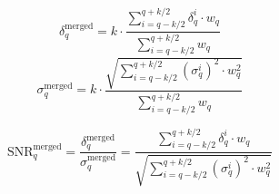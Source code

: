 
\begin{equation}
    \label{eq:merged_power}
    \delta_{q}^\text{merged} = k \cdot \frac{ \sum_{i = q-k/2}^{q+k/2}\delta_{q}^{i} \cdot {w_{q}}}{\sum_{i = q-k/2}^{q+k/2} {w_{q}}}
\end{equation}
\begin{equation}
    \label{eq:merged_sigma}
    \sigma_{q}^\text{merged} = k \cdot \frac{ \sqrt{\sum_{i = q-k/2}^{q+k/2} (\sigma_{q}^{i})^2 \cdot {w_{q}^2}}}{\sum_{i = q-k/2}^{q+k/2} {w_{q}}}
\end{equation}

\begin{equation}
    \label{eq:merged_snr}
    \text{SNR}_{q}^\text{merged} = \frac{\delta^\text{merged}_{q}}{\sigma^\text{merged}_{q}} = \frac{\sum_{i = q-k/2}^{q+k/2}\delta_{q}^{i} \cdot {w_{q}}}{ \sqrt{\sum_{i = q-k/2}^{q+k/2} (\sigma_{q}^{i})^2 \cdot {w_{q}^2}}}
\end{equation}




